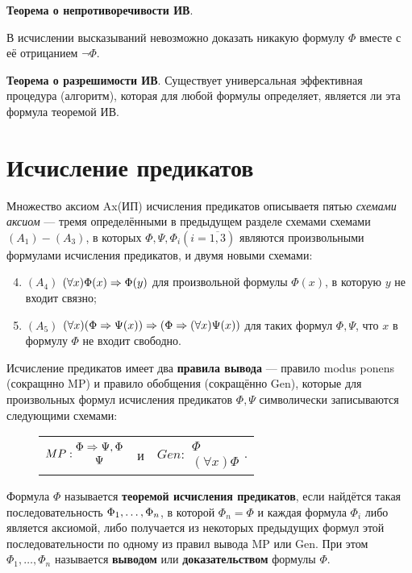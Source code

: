 \textbf{Теорема о непротиворечивости ИВ}.

В исчислении высказываний невозможно доказать никакую формулу $\Phi$ вместе с её отрицанием $\lnot \Phi$.



\textbf{Теорема о разрешимости ИВ}.
Существует универсальная эффективная процедура (алгоритм), которая для любой формулы определяет, является ли эта формула теоремой ИВ.

\section{Исчисление предикатов}
Множество аксиом Ax(ИП) исчисления предикатов описываетя пятью \textit{схемами аксиом} --- тремя определёнными в предыдущем разделе схемами схемами $(A_1)-(A_3)$, в которых $\Phi, \Psi, \Phi_i (i = \overline{1,3})$ являются произвольными формулами исчисления предикатов, и двумя новыми схемами:
\begin{enumerate}
    \setcounter{enumi}{3}
    \item $(A_4)$ $(\forall x)\Phi(x) \then \Phi(y)$ для произвольной формулы $\Phi(x)$, в которую $y$ не входит связно;
    \item $(A_5)$ $(\forall x)(\Phi \then \Psi(x)) \then (\Phi \then (\forall x)\Psi(x))$ для таких формул $\Phi, \Psi$, что $x$ в формулу $\Phi$ не входит свободно.
\end{enumerate}

Исчисление предикатов имеет два \textbf{правила вывода} --- правило modus ponens (сокращнно MP) и правило обобщения (сокращённо Gen), которые для произвольных формул исчисления предикатов $\Phi, \Psi$ символически записываются следующими схемами:
\begin{figure}[H]
    \centering
    \begin{tabular*}{0.5\textwidth}{@{\extracolsep{\fill}}ccc@{}}
        $MP: \begin{matrix}
            \Phi \then \Psi, \Phi \\
            \Psi
        \end{matrix}$ &
        и &
        $Gen: \begin{matrix}
            \Phi \\
            (\forall x)\Phi
        \end{matrix}$.
    \end{tabular*}
\end{figure}

\dftion Формула $\Phi$ называется \textbf{теоремой исчисления предикатов}, если найдётся такая последовательность $\xses[\Phi]$, в которой $\Phi_n = \Phi$ и каждая формула $\Phi_i$ либо является аксиомой, либо получается из некоторых предыдущих формул этой последовательности по одному из правил вывода MP или Gen. При этом $\Phi_1, \dots, \Phi_n$ называется \textbf{выводом} или \textbf{доказательством} формулы $\Phi$.


